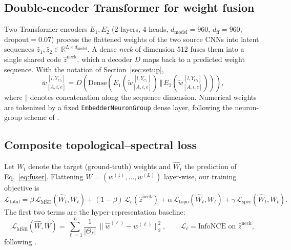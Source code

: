\documentclass{article}
\newcommand{\wt}[1]{\tilde{w}_{#1}}       %
\newcommand{\wh}[1]{\bar{w}_{#1}}          %
\begin{document}
\subsection{Double-encoder Transformer for weight fusion}
\label{sec:method:arch}

Two Transformer encoders $E_1,E_2$ (2 layers, 4 heads, $d_{\mathrm{model}}=960$,
$d_{\mathrm{ff}}=960$, $\mathrm{dropout}=0.07$) process the flattened
weights of the two source CNNs into latent sequences
$\hat z_1,\hat z_2\in\mathbb{R}^{L\times d_{\mathrm{model}}}$.  A dense
\emph{neck} of dimension $512$ fuses them into a single shared code
$\hat z^{\mathrm{neck}}$, which a decoder $D$ maps back to a predicted
weight sequence.  With the notation of Section~\ref{sec:setup},
\begin{equation}
\wh{[A,i,e]}^{\,[l,Y_{C_3}]}
= D\!\left(\mathrm{Dense}\!\left(E_1(\wt{[A,i,e]}^{\,[l,Y_{C_1}]})
                          \,\Vert\, E_2(\wt{[A,i,e]}^{\,[l,Y_{C_2}]})\right)\right),
\label{eq:fuser}
\end{equation}
where $\Vert$ denotes concatenation along the sequence dimension.
Numerical weights are tokenized by a fixed \texttt{EmbedderNeuronGroup}
dense layer, following the neuron-group scheme of
\citet{schurholtSelfSupervisedRepresentationLearning2021}.

\subsection{Composite topological--spectral loss}
\label{sec:method:loss}

Let $W_t$ denote the target (ground-truth) weights and
$\hat W_t$ the prediction of Eq.~\eqref{eq:fuser}.  Flattening
$W=(w^{(1)},\ldots,w^{(L)})$ layer-wise, our training objective is
\begin{equation}
\mathcal{L}_{\text{total}}
= \beta\,\mathcal{L}_{\overline{\text{MSE}}}(\hat W_t,W_t)
+ (1-\beta)\,\mathcal{L}_{c}(\hat z^{\mathrm{neck}})
+ \alpha\,\mathcal{L}_{\text{topo}}(\hat W_t,W_t)
+ \gamma\,\mathcal{L}_{\text{spec}}(\hat W_t,W_t).
\label{eq:loss}
\end{equation}
The first two terms are the hyper-representation baseline:
\begin{equation}
\mathcal{L}_{\overline{\text{MSE}}}(\hat W,W)
= \sum_{\ell=1}^{L}\frac{1}{|\Theta_\ell|}\,
  \bigl\|\hat w^{(\ell)}-w^{(\ell)}\bigr\|_2^2,
\qquad
\mathcal{L}_c = \text{InfoNCE on } \hat z^{\mathrm{neck}},
\end{equation}
following \citet{schurholtSelfSupervisedRepresentationLearning2021}.
\end{document}
